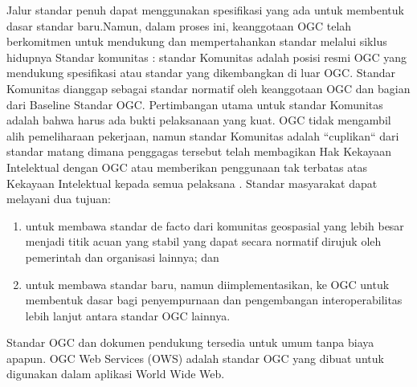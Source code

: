 Jalur standar penuh dapat menggunakan spesifikasi yang ada untuk membentuk dasar standar baru.Namun, dalam proses ini, keanggotaan OGC telah berkomitmen untuk mendukung dan mempertahankan standar melalui siklus hidupnya
Standar komunitas : standar Komunitas adalah posisi resmi OGC yang mendukung spesifikasi atau standar yang dikembangkan di luar OGC. Standar Komunitas dianggap sebagai standar normatif oleh keanggotaan OGC dan bagian dari Baseline Standar OGC. Pertimbangan utama untuk standar Komunitas adalah bahwa harus ada bukti pelaksanaan yang kuat. OGC tidak mengambil alih pemeliharaan pekerjaan, namun standar Komunitas adalah ``cuplikan`` dari standar matang dimana penggagas tersebut telah membagikan Hak Kekayaan Intelektual dengan OGC atau memberikan penggunaan tak terbatas atas Kekayaan Intelektual kepada semua pelaksana .
Standar masyarakat dapat melayani dua tujuan:
\begin{enumerate}
\item	untuk membawa standar de facto dari komunitas geospasial yang lebih besar menjadi titik acuan yang stabil yang dapat secara normatif dirujuk oleh pemerintah dan organisasi lainnya; dan
\item	untuk membawa standar baru, namun diimplementasikan, ke OGC untuk membentuk dasar bagi penyempurnaan dan pengembangan interoperabilitas lebih lanjut antara standar OGC lainnya.
\end{enumerate}

Standar OGC dan dokumen pendukung tersedia untuk umum tanpa biaya apapun.
OGC Web Services (OWS) adalah standar OGC yang dibuat untuk digunakan dalam aplikasi World Wide Web. \cite{lupp2008open} 
